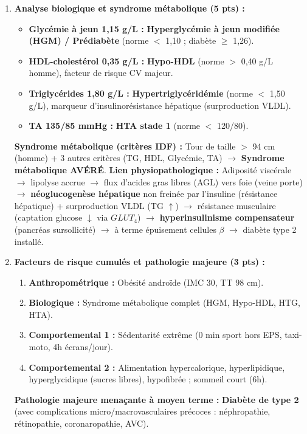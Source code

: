 \documentclass[11pt]{article}
\begin{document}
\begin{corrige}
\begin{enumerate}
\item \textbf{Analyse biologique et syndrome métabolique (5 pts) :}
\begin{itemize}
\item \textbf{Glycémie à jeun 1,15 g/L :} \textbf{Hyperglycémie à jeun modifiée (HGM) / Prédiabète} (norme $<$ 1,10 ; diabète $\ge$ 1,26).
\item \textbf{HDL-cholestérol 0,35 g/L :} \textbf{Hypo-HDL} (norme $>$ 0,40 g/L homme), facteur de risque CV majeur.
\item \textbf{Triglycérides 1,80 g/L :} \textbf{Hypertriglycéridémie} (norme $<$ 1,50 g/L), marqueur d'insulinorésistance hépatique (surproduction VLDL).
\item \textbf{TA 135/85 mmHg :} \textbf{HTA stade 1} (norme $<$ 120/80).
\end{itemize}
\textbf{Syndrome métabolique (critères IDF) :} Tour de taille $>$ 94 cm (homme) + 3 autres critères (TG, HDL, Glycémie, TA) $\rightarrow$ \textbf{Syndrome métabolique AVÉRÉ}.
\textbf{Lien physiopathologique :} Adiposité viscérale $\rightarrow$ lipolyse accrue $\rightarrow$ flux d'acides gras libres (AGL) vers foie (veine porte) $\rightarrow$ \textbf{néoglucogenèse hépatique} non freinée par l'insuline (résistance hépatique) + surproduction VLDL (TG $\uparrow$) $\rightarrow$ résistance musculaire (captation glucose $\downarrow$ via $GLUT_4$) $\rightarrow$ \textbf{hyperinsulinisme compensateur} (pancréas sursollicité) $\rightarrow$ à terme épuisement cellules $\beta$ $\rightarrow$ diabète type 2 installé.

\item \textbf{Facteurs de risque cumulés et pathologie majeure (3 pts) :}
\begin{enumerate}
\item \textbf{Anthropométrique :} Obésité androïde (IMC 30, TT 98 cm).
\item \textbf{Biologique :} Syndrome métabolique complet (HGM, Hypo-HDL, HTG, HTA).
\item \textbf{Comportemental 1 :} Sédentarité extrême (0 min sport hors EPS, taxi-moto, 4h écrans/jour).
\item \textbf{Comportemental 2 :} Alimentation hypercalorique, hyperlipidique, hyperglycidique (sucres libres), hypofibrée ; sommeil court (6h).
\end{enumerate}
\textbf{Pathologie majeure menaçante à moyen terme :} \textbf{Diabète de type 2} (avec complications micro/macrovasculaires précoces : néphropathie, rétinopathie, coronaropathie, AVC).


\end{enumerate}
\end{corrige}
\end{document}
